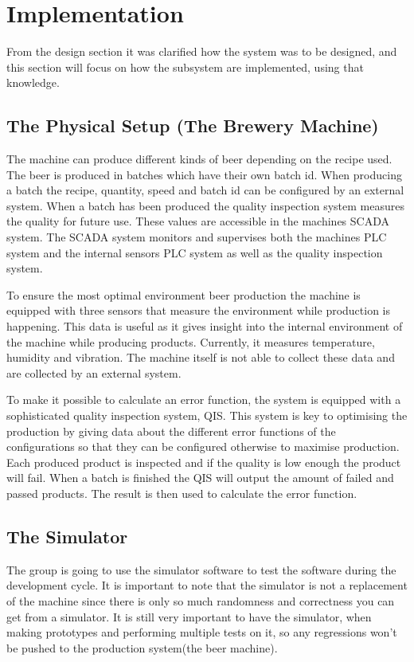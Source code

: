 \section{Implementation}
From the design section it was clarified how the system was to be designed, and
this section will focus on how the subsystem are implemented, using that
knowledge.

\subsection{The Physical Setup (The Brewery Machine)}

The machine can produce different kinds of beer depending on the recipe
used. The beer is produced in batches which have their own batch id. When 
producing a batch the recipe, quantity, speed and batch id can be configured by 
an external system. When a batch has been produced the quality inspection system 
measures the quality for future use. These values are accessible in the machines 
SCADA system. The SCADA system monitors and supervises both the machines PLC 
system and the internal sensors PLC system as well as the quality inspection 
system.

To ensure the most optimal environment beer production the 
machine is equipped with three sensors that measure the environment while 
production is happening. This data is useful as it gives insight into the 
internal environment of the machine while producing products. Currently, it 
measures temperature, humidity and vibration. The machine itself is not able to 
collect these data and are collected by an external system.

To make it possible to calculate an error function, the system is 
equipped with a sophisticated quality inspection system, QIS. This system is key to 
optimising the production by giving data about the different error functions of 
the configurations so that they can be configured otherwise to maximise 
production. Each produced product is inspected and if the quality is low enough
the product will fail. When a batch is finished the QIS will output the amount 
of failed and passed products. The result is then used to calculate the error
function.


\subsection{The Simulator}
The group is going to use the simulator software to test the software during the
development cycle.
It is important to note that the simulator is not a replacement of the machine
since there is only so much randomness and correctness you can get from a 
simulator. 
It is still very important to have the simulator, when making prototypes and 
performing multiple tests on it, so any regressions won't be pushed to 
the production system(the beer machine).


